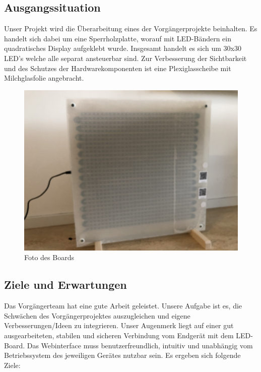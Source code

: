 \documentclass[12pt,a4paper]{article}
\begin{document}
\subsection{Ausgangssituation}
Unser Projekt wird die Überarbeitung eines der Vorgängerprojekte beinhalten. Es handelt sich dabei um eine Sperrholzplatte, worauf mit LED-Bändern ein quadratisches Display aufgeklebt wurde. Insgesamt handelt es sich um 30x30 LED's welche alle separat ansteuerbar sind. Zur Verbesserung der Sichtbarkeit und des Schutzes der Hardwarekomponenten ist eine Plexiglasscheibe mit Milchglasfolie angebracht. 
	
	\begin{figure}[h]	
	\centering
	\includegraphics[scale=0.07]{LEDBoard.jpg}
	\caption{Foto des Boards}
	\label{fig:LED-Board}
	\end{figure}

\subsection{Ziele und Erwartungen}
Das Vorgängerteam hat eine gute Arbeit geleistet. Unsere Aufgabe ist es, die Schwächen des Vorgängerprojektes auszugleichen und eigene Verbesserungen/Ideen zu integrieren. Unser Augenmerk liegt auf einer gut ausgearbeiteten, stabilen und sicheren Verbindung vom Endgerät mit dem LED-Board. Das Webinterface muss benutzerfreundlich, intuitiv und unabhängig vom Betriebssystem des jeweiligen Gerätes nutzbar sein. 
Es ergeben sich folgende Ziele: 
\end{document}
